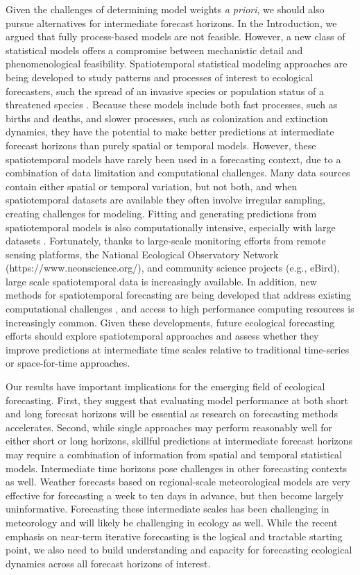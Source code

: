 \documentclass[11pt]{article}
\begin{document}
Given the challenges of determining model weights \emph{a priori}, we should also pursue alternatives for intermediate forecast horizons. In the Introduction, we argued that fully process-based models are not feasible. However, a new class of statistical models offers a compromise between mechanistic detail and phenomenological feasibility. Spatiotemporal statistical modeling approaches are being developed to study patterns and processes of interest to ecological forecasters, such the spread of an invasive species or population status of a threatened species  \citep{Wikle2003,Williams2017,Schliep2018}. Because these models include both fast processes, such as births and deaths, and slower processes, such as colonization and extinction dynamics, they have the potential to make better predictions at intermediate forecast horizons than purely spatial or temporal models. However, these spatiotemporal models have rarely been used in a forecasting context, due to a combination of data limitation and computational challenges. Many data sources contain either spatial or temporal variation, but not both, and when spatiotemporal datasets are available they often involve irregular sampling, creating challenges for modeling. Fitting and generating predictions from spatiotemporal models is also computationally intensive, especially with large datasets \citep{McDermott2017}. Fortunately, thanks to large-scale monitoring efforts from remote sensing platforms, the National Ecological Observatory Network (https://www.neonscience.org/), and community science projects (e.g., eBird), large scale spatiotemporal data is increasingly available. In addition, new methods for spatiotemporal forecasting are being developed that address existing computational challenges \citep{McDermott2017}, and access to high performance computing resources is increasingly common. Given these developments, future ecological forecasting efforts should explore spatiotemporal approaches and assess whether they improve predictions at intermediate time scales relative to traditional time-series or space-for-time approaches.

Our results have important implications for the emerging field of ecological forecasting. First, they suggest that evaluating model performance at both short and long forecsat horizons will be essential as research on forecasting methods accelerates. Second, while single approaches may perform reasonably well for either short or long horizons, skillful predictions at intermediate forecast horizons may require a combination of information from spatial and temporal statistical models. Intermediate time horizons pose challenges in other forecasting contexts as well. Weather forecasts based on regional-scale meteorological models are very effective for forecasting a week to ten days in advance, but then become largely uninformative. Forecasting these intermediate scales has been challenging in meteorology and will likely be challenging in ecology as well. While the recent emphasis on near-term iterative forecasting \citep{dietze_iterative_2018} is the logical and tractable starting point, we also need to build understanding and capacity for forecasting ecological dynamics across all forecast horizons of interest.
\end{document}
